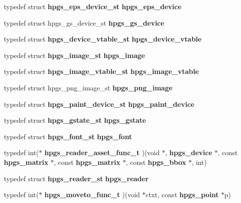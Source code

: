 \begin{CompactItemize}
\item 
typedef struct {\bf hpgs\_\-eps\_\-device\_\-st} \textbf{hpgs\_\-eps\_\-device}\label{group__device_g648708ea6527d8ffec62f075471c78f9}

\item 
typedef struct hpgs\_\-gs\_\-device\_\-st \textbf{hpgs\_\-gs\_\-device}\label{group__device_g21b6ff6181ec0b14869ddf3aef4fc0e0}

\item 
typedef struct {\bf hpgs\_\-device\_\-vtable\_\-st} \textbf{hpgs\_\-device\_\-vtable}\label{group__device_g503100ff768d14078274b7abe457ac93}

\item 
typedef struct {\bf hpgs\_\-image\_\-st} \textbf{hpgs\_\-image}\label{group__device_ge374b15dff89c5d2c569c4250d4e3a2b}

\item 
typedef struct {\bf hpgs\_\-image\_\-vtable\_\-st} \textbf{hpgs\_\-image\_\-vtable}\label{group__device_g3d673430a5742c7e44d5494bb124d221}

\item 
typedef struct hpgs\_\-png\_\-image\_\-st \textbf{hpgs\_\-png\_\-image}\label{group__device_g73df7e42f65edb523ba4869a4c20155c}

\item 
typedef struct {\bf hpgs\_\-paint\_\-device\_\-st} \textbf{hpgs\_\-paint\_\-device}\label{group__device_g4ca0f0bd51075fb9da27bf731ab5eefd}

\item 
typedef struct {\bf hpgs\_\-gstate\_\-st} \textbf{hpgs\_\-gstate}\label{group__device_g2cbad771732e3c16b8efa41910affdf3}

\item 
typedef struct {\bf hpgs\_\-font\_\-st} \textbf{hpgs\_\-font}\label{group__device_gd67dc54687613dc2af6ca86aa2a61cb3}

\item 
typedef int($\ast$ \textbf{hpgs\_\-reader\_\-asset\_\-func\_\-t} )(void $\ast$, {\bf hpgs\_\-device} $\ast$, const {\bf hpgs\_\-matrix} $\ast$, const {\bf hpgs\_\-matrix} $\ast$, const {\bf hpgs\_\-bbox} $\ast$, int)\label{group__device_gb994453805be117de7c3e23d451b3348}

\item 
typedef struct {\bf hpgs\_\-reader\_\-st} \textbf{hpgs\_\-reader}\label{group__reader_g9fe73110cf6f76ff88160a677e4a5c4e}

\item 
typedef int($\ast$ \textbf{hpgs\_\-moveto\_\-func\_\-t} )(void $\ast$ctxt, const {\bf hpgs\_\-point} $\ast$p)\label{group__font_gdb482453b858b6b9561c76752f3e0e46}


\end{CompactItemize}
